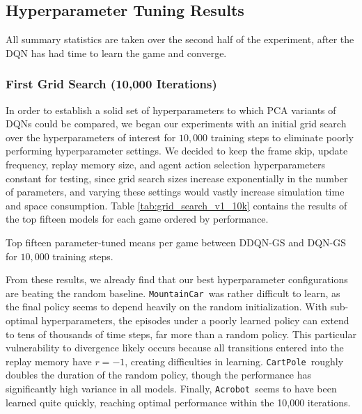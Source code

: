 \documentclass[11pt]{article}
\newcommand{\cp}{\texttt{CartPole}}
\newcommand{\ab}{\texttt{Acrobot}}
\newcommand{\mc}{\texttt{MountainCar}}
\begin{document}


\subsection{Hyperparameter Tuning Results}


All summary statistics are taken over the second half of the experiment, after the DQN has had time to learn the game and converge.

\subsubsection{First Grid Search (10,000 Iterations)}

In order to establish a solid set of hyperparameters to which PCA variants of DQNs could be compared, we began our experiments with an initial grid search over the hyperparameters of interest for $10,000$ training steps to eliminate poorly performing hyperparameter settings. We decided to keep the frame skip, update frequency, replay memory size, and agent action selection hyperparameters constant for testing, since grid search sizes increase exponentially in the number of parameters, and varying these settings would vastly increase simulation time and space consumption. Table \ref{tab:grid_search_v1_10k} contains the results of the top fifteen models for each game ordered by performance.

\begin{table}[!htbp]
  \footnotesize
  \centering
  
  
  \caption{Top fifteen parameter-tuned means per game between DDQN-GS and DQN-GS for $10,000$ training steps.}
  \label{tab:grid_search_v1_10k}
\end{table}

From these results, we already find that our best hyperparameter configurations are beating the random baseline. \mc~was rather difficult to learn, as the final policy seems to depend heavily on the random initialization. With sub-optimal hyperparameters, the episodes under a poorly learned policy can extend to tens of thousands of time steps, far more than a random policy. This particular vulnerability to divergence likely occurs because all transitions entered into the replay memory have $r = -1$, creating difficulties in learning. \cp~roughly doubles the duration of the random policy, though the performance has significantly high variance in all models. Finally, \ab~seems to have been learned quite quickly, reaching optimal performance within the 10,000 iterations.
\end{document}

